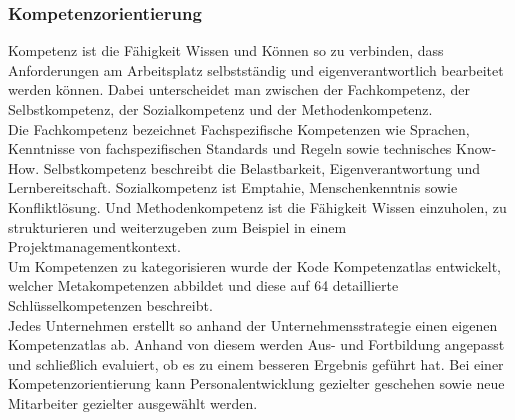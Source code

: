 \documentclass{article}
\begin{document}
	 \subsubsection{Kompetenzorientierung}
	 Kompetenz ist die Fähigkeit Wissen und Können so zu verbinden, dass Anforderungen am Arbeitsplatz selbstständig und eigenverantwortlich bearbeitet werden können. Dabei unterscheidet man zwischen der Fachkompetenz, der Selbstkompetenz, der Sozialkompetenz und der Methodenkompetenz. \\
	 Die Fachkompetenz bezeichnet Fachspezifische Kompetenzen wie Sprachen, Kenntnisse von fachspezifischen Standards und Regeln sowie technisches Know-How. Selbstkompetenz beschreibt die Belastbarkeit, Eigenverantwortung und Lernbereitschaft. Sozialkompetenz ist Emptahie, Menschenkenntnis sowie Konfliktlösung. Und Methodenkompetenz ist die Fähigkeit Wissen einzuholen, zu strukturieren und weiterzugeben zum Beispiel in einem Projektmanagementkontext. \\
	 Um Kompetenzen zu kategorisieren wurde der Kode Kompetenzatlas entwickelt, welcher Metakompetenzen abbildet und diese auf 64 detaillierte Schlüsselkompetenzen beschreibt. \\
	 Jedes Unternehmen erstellt so anhand der Unternehmensstrategie einen eigenen Kompetenzatlas ab. Anhand von diesem werden Aus- und Fortbildung angepasst und schließlich evaluiert, ob es zu einem besseren Ergebnis geführt hat. Bei einer Kompetenzorientierung kann Personalentwicklung gezielter geschehen sowie neue Mitarbeiter gezielter ausgewählt werden.
\end{document}
